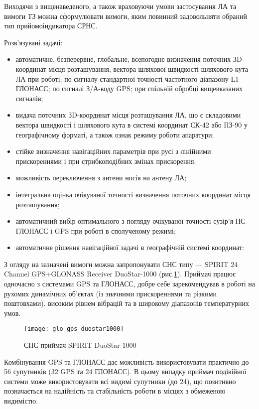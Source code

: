 Виходячи з вищенаведеного, а також враховуючи умови застосування ЛА та вимоги 
ТЗ можна сформулювати вимоги, яким повинний задовольняти обраний тип прийомоіндикатора 
СРНС. 

Розв'язувані задачі:
\begin{itemize}
\item автоматичне, безперервне, глобальне, всепогодне визначення поточних ЗD-координат 
місця розташування, вектора шляхової швидкості шляхового кута ЛА при роботі: по 
сигналу стандартної точності частотного діапазону L1 ГЛОНАСС; по сигналі З/А-коду 
GPS; при спільній обробці вищевказаних сигналів;
\item видача поточних ЗD-координат місця розташування ЛА, що є складовими вектора 
швидкості і шляхового кута в системі координат СК-42 або ПЗ-90 у географічному 
форматі, а також ознак режиму роботи апаратури;
\item стійке визначення навігаційних параметрів при русі з лінійними прискореннями 
і при стрибкоподібних змінах прискорення;
\item  можливість переключення з антени носія на антену ЛА; 
\item інтегральна оцінка очікуваної точності визначення поточних координат місця розташування;
\item автоматичний вибір оптимального з погляду очікуваної точності сузір'я НС ГЛОНАСС і GPS при роботі в сполученому режимі;
\item автоматичне рішення навігаційної задачі в географічній системі координат:  
\end{itemize}

З огляду на зазначені вимоги можна запропонувати СНС типу --- SPIRIT 24 Channel
GPS+GLONASS Receiver DuoStar-1000 (рис.\ref{fig:glo_gps_duostar1000}). Приймач працює одночасно з системами GPS та ГЛОНАСС, добре себе зарекомендував в роботі на рухомих динамічних об’єктах (із значними прискореннями та різкими поштовхами), високим рівнем вібрацій та в широкому діапазонів температурних умов.
\begin{figure}[here]
\centering
\texttt{[image: glo\_gps\_duostar1000]}
\caption{СНС приймач SPIRIT DuoStar-1000}
\label{fig:glo_gps_duostar1000}
\end{figure} 

Комбінування GPS та ГЛОНАСС дає можливість використовувати практично до 56 супутників (32 GPS та 24 ГЛОНАСС). В цьому випадку приймач подівійної системи може використовувати всі видимі супутники (до 24), що позитивно позначається на надійність та стабільність роботи в місцях з обмеженою видимістю.

